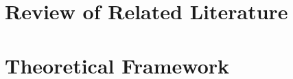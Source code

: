  







\DoubleSpacing

\chapter{Review of Related Literature} 
	\label{ch:rrl} 
	
	\clearpage

\chapter{Theoretical Framework} 
	\label{ch:theory} 
	
	\clearpage


\printbibliography

